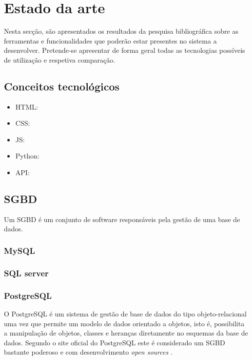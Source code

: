 \chapter{Estado da arte}
\label{state}


Nesta secção, são apresentados os resultados da pesquisa bibliográfica sobre as ferramentas e funcionalidades que poderão estar presentes no sistema a desenvolver. Pretende-se apresentar de forma geral todas as tecnologias possíveis de utilização e respetiva comparação. 



\section{Conceitos tecnológicos}


\begin{itemize}
	\item \ac{HTML}: 
	\item \ac{CSS}: 
	\item \ac{JS}: 
	\item Python: 
	
	\item \ac{API}: 
	
\end{itemize}



\section{\acl{SGBD}}

Um \ac{SGBD} é um conjunto de software responsáveis pela gestão de uma base de dados.






\subsection{MySQL}



\subsection{SQL server}



\subsection{PostgreSQL}

O PostgreSQL é um sistema de gestão de base de dados do tipo objeto-relacional uma vez que permite um modelo de dados orientado a objetos, isto é, possibilita a manipulação de objetos, classes e heranças diretamente no esquemas da base de dados. Segundo o site oficial do PostgreSQL este é considerado um \ac{SGBD} bastante poderoso e com desenvolvimento \textit{open sources} \cite{ThePostgreSQLGlobalDevelopmentGroup2012}. 


